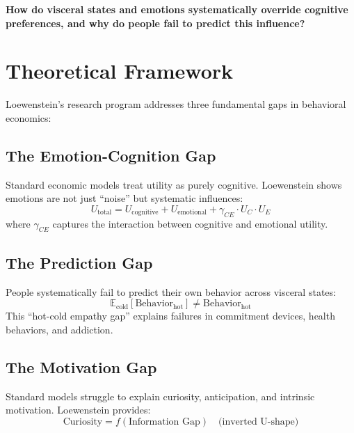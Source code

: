 \begin{tcolorbox}[colback=red!5!white, colframe=red!75!black,
    title=The Fundamental Question]
\textbf{How do visceral states and emotions systematically override cognitive preferences, and why do people fail to predict this influence?}
\end{tcolorbox}


\section{Theoretical Framework}
\label{sec:lo-theory}

Loewenstein's research program addresses three fundamental gaps in behavioral economics:

\subsection{The Emotion-Cognition Gap}

Standard economic models treat utility as purely cognitive. Loewenstein shows emotions are not just ``noise'' but systematic influences:
\begin{equation}
U_{\text{total}} = U_{\text{cognitive}} + U_{\text{emotional}} + \gamma_{CE} \cdot U_C \cdot U_E
\end{equation}
where $\gamma_{CE}$ captures the interaction between cognitive and emotional utility.

\subsection{The Prediction Gap}

People systematically fail to predict their own behavior across visceral states:
\begin{equation}
\mathbb{E}_{\text{cold}}[\text{Behavior}_{\text{hot}}] \neq \text{Behavior}_{\text{hot}}
\end{equation}
This ``hot-cold empathy gap'' explains failures in commitment devices, health behaviors, and addiction.

\subsection{The Motivation Gap}

Standard models struggle to explain curiosity, anticipation, and intrinsic motivation. Loewenstein provides:
\begin{equation}
\text{Curiosity} = f(\text{Information Gap}) \quad \text{(inverted U-shape)}
\end{equation}


